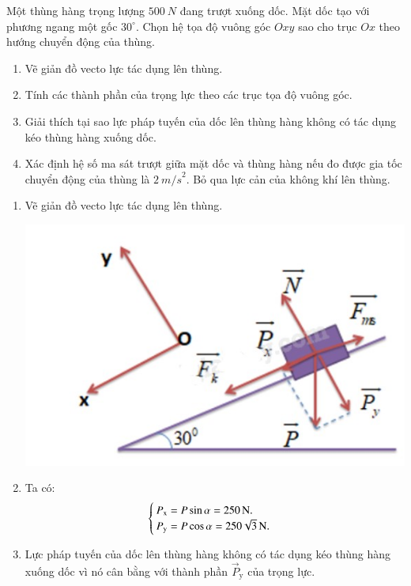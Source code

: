 \begin{enumerate}[label=\bfseries Bài \arabic*:,leftmargin=1.5cm]
{
	Một thùng hàng trọng lượng $\SI{500}{N}$ đang trượt xuống dốc. Mặt dốc tạo với phương ngang một gốc $30^\circ$. Chọn hệ tọa độ vuông góc $Oxy$ sao cho trục $Ox$ theo hướng chuyển động của thùng.
	\begin{enumerate}[label=\alph*)]
		\item  Vẽ giản đồ vecto lực tác dụng lên thùng.
		\item Tính các thành phần của trọng lực theo các trục tọa độ vuông góc.
		\item Giải thích tại sao lực pháp tuyến của dốc lên thùng hàng không có tác dụng kéo thùng hàng xuống dốc.
		\item Xác định hệ số ma sát trượt giữa mặt dốc và thùng hàng nếu đo được gia tốc chuyển động của thùng là $\SI{2}{m/s}^2$. Bỏ qua lực cản của không khí lên thùng.
	\end{enumerate}
}

\hideall
{
	
	\begin{enumerate}[label=\alph*)]
		\item  Vẽ giản đồ vecto lực tác dụng lên thùng.
		
		
		\begin{center}
			\includegraphics[scale=0.5]{../figs/VN10-2022-PH-TP021-14.jpg}
		\end{center}
		
		\item 
		Ta có:
		$$\begin{cases}
			P_\text{x}= P\sin \alpha = \SI{250}{N}.   \\
			P_\text{y}= P \cos \alpha = \xsi{250\sqrt 3}{N}.
		\end{cases}$$
		
		\item Lực pháp tuyến của dốc lên thùng hàng không có tác dụng kéo thùng hàng xuống dốc vì nó cân bằng với thành phần $\vec P_\text{y}$
		của trọng lực.
		

\end{enumerate}}
\end{enumerate}
